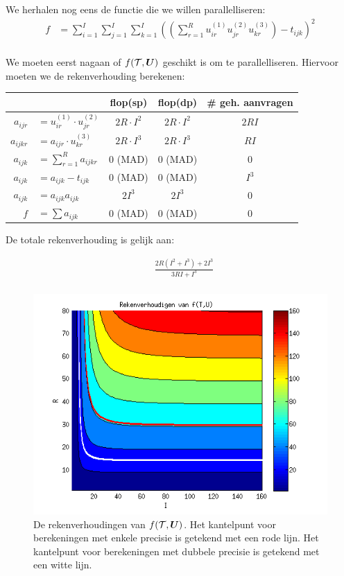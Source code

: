 We herhalen nog eens de functie die we willen parallelliseren:
\begin{align*}
	f &= \sum_{i = 1}^I \sum_{j = 1}^I \sum_{k = 1}^I \left( \left( \sum_{r=1}^{R} u^{(1)}_{i r} u^{(2)}_{j r} u^{(3)}_{k r} \right) - t_{ijk}\right)^2 \\
\end{align*}

We moeten eerst nagaan of $f(\mathcal{T}, \boldsymbol{U})$ geschikt is om te parallelliseren. Hiervoor moeten we de rekenverhouding berekenen:\\
\begin{tabular}{|r l|c| c|c|}
\hline
					&							& flop(sp)			& flop(dp) 			& \# geh. aanvragen	\\
\hline
$a_{ij r} $	&$= u^{(1)}_{i r} \cdot%
u^{(2)}_{j r}$									& $2 R \cdot I^2$	& $2 R \cdot I^2$	&	$2RI$			\\
$a_{ijk r} $&$= a_{ij r} \cdot u^{(3)}_{k r}$	& $2 R \cdot I^3$	& $2 R \cdot I^3$	&	$RI$			\\
$a_{ijk} $	&$= \sum_{r=1}^{R} a_{ijk r}$		& 0 (MAD)			& 0 (MAD)			&	$0$				\\
\hline
$a_{ijk} $	&$= a_{ijk}  - t_{ijk}$				& 0 (MAD)			& 0 (MAD)			&	$I^3$			\\
$a_{ijk} $	&$= a_{ijk} a_{ijk}$				& $2 I^3$			& $2 I^3$			&	0				\\
$f $		&$= \sum a_{ijk}$					& 0 (MAD)			& 0 (MAD)			&	0				\\
\hline
\end{tabular}

De totale rekenverhouding is gelijk aan:

\begin{align*}
    & \frac{2R (I^2 + I^3) + 2I^3}{3RI + I^3}\\
\end{align*}

\begin{figure}
\centering
\includegraphics{haalF}
\caption{\label{haalF}De rekenverhoudingen van $f(\mathcal{T}, \boldsymbol{U})$. Het kantelpunt voor berekeningen met enkele precisie is getekend met een rode lijn. Het kantelpunt voor berekeningen met dubbele precisie is getekend met een witte lijn.}
\end{figure}

